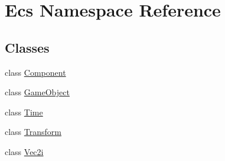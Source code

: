 \hypertarget{namespace_ecs}{}\section{Ecs Namespace Reference}
\label{namespace_ecs}
\subsection*{Classes}
\begin{DoxyCompactItemize}
\item 
class \mbox{\hyperlink{class_ecs_1_1_component}{Component}}
\item 
class \mbox{\hyperlink{class_ecs_1_1_game_object}{Game\+Object}}
\item 
class \mbox{\hyperlink{class_ecs_1_1_time}{Time}}
\item 
class \mbox{\hyperlink{class_ecs_1_1_transform}{Transform}}
\item 
class \mbox{\hyperlink{class_ecs_1_1_vec2i}{Vec2i}}
\end{DoxyCompactItemize}
